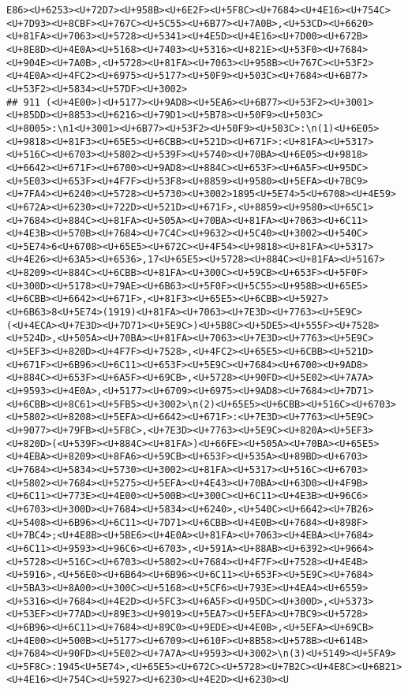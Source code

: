 \documentclass[
]{article}
\begin{document}
\begin{verbatim}
E86><U+6253><U+72D7><U+958B><U+6E2F><U+5F8C><U+7684><U+4E16><U+754C><U+7D93><U+8CBF><U+767C><U+5C55><U+6B77><U+7A0B>,<U+53CD><U+6620><U+81FA><U+7063><U+5728><U+5341><U+4E5D><U+4E16><U+7D00><U+672B><U+8E8D><U+4E0A><U+5168><U+7403><U+5316><U+821E><U+53F0><U+7684><U+904E><U+7A0B>,<U+5728><U+81FA><U+7063><U+958B><U+767C><U+53F2><U+4E0A><U+4FC2><U+6975><U+5177><U+50F9><U+503C><U+7684><U+6B77><U+53F2><U+5834><U+57DF><U+3002>
## 911 (<U+4E00>)<U+5177><U+9AD8><U+5EA6><U+6B77><U+53F2><U+3001><U+85DD><U+8853><U+6216><U+79D1><U+5B78><U+50F9><U+503C><U+8005>:\n1<U+3001><U+6B77><U+53F2><U+50F9><U+503C>:\n(1)<U+6E05><U+9818><U+81F3><U+65E5><U+6CBB><U+521D><U+671F>:<U+81FA><U+5317><U+516C><U+6703><U+5802><U+539F><U+5740><U+70BA><U+6E05><U+9818><U+6642><U+671F><U+6700><U+9AD8><U+884C><U+653F><U+6A5F><U+95DC><U+5E03><U+653F><U+4F7F><U+53F8><U+8859><U+9580><U+5EFA><U+7BC9><U+7FA4><U+6240><U+5728><U+5730><U+3002>1895<U+5E74>5<U+6708><U+4E59><U+672A><U+6230><U+722D><U+521D><U+671F>,<U+8859><U+9580><U+65C1><U+7684><U+884C><U+81FA><U+505A><U+70BA><U+81FA><U+7063><U+6C11><U+4E3B><U+570B><U+7684><U+7C4C><U+9632><U+5C40><U+3002><U+540C><U+5E74>6<U+6708><U+65E5><U+672C><U+4F54><U+9818><U+81FA><U+5317><U+4E26><U+63A5><U+6536>,17<U+65E5><U+5728><U+884C><U+81FA><U+5167><U+8209><U+884C><U+6CBB><U+81FA><U+300C><U+59CB><U+653F><U+5F0F><U+300D><U+5178><U+79AE><U+6B63><U+5F0F><U+5C55><U+958B><U+65E5><U+6CBB><U+6642><U+671F>,<U+81F3><U+65E5><U+6CBB><U+5927><U+6B63>8<U+5E74>(1919)<U+81FA><U+7063><U+7E3D><U+7763><U+5E9C>(<U+4ECA><U+7E3D><U+7D71><U+5E9C>)<U+5B8C><U+5DE5><U+555F><U+7528><U+524D>,<U+505A><U+70BA><U+81FA><U+7063><U+7E3D><U+7763><U+5E9C><U+5EF3><U+820D><U+4F7F><U+7528>,<U+4FC2><U+65E5><U+6CBB><U+521D><U+671F><U+6B96><U+6C11><U+653F><U+5E9C><U+7684><U+6700><U+9AD8><U+884C><U+653F><U+6A5F><U+69CB>,<U+5728><U+90FD><U+5E02><U+7A7A><U+9593><U+4E0A>,<U+5177><U+6709><U+6975><U+9AD8><U+7684><U+7D71><U+6CBB><U+8C61><U+5FB5><U+3002>\n(2)<U+65E5><U+6CBB><U+516C><U+6703><U+5802><U+8208><U+5EFA><U+6642><U+671F>:<U+7E3D><U+7763><U+5E9C><U+9077><U+79FB><U+5F8C>,<U+7E3D><U+7763><U+5E9C><U+820A><U+5EF3><U+820D>(<U+539F><U+884C><U+81FA>)<U+66FE><U+505A><U+70BA><U+65E5><U+4EBA><U+8209><U+8FA6><U+59CB><U+653F><U+535A><U+89BD><U+6703><U+7684><U+5834><U+5730><U+3002><U+81FA><U+5317><U+516C><U+6703><U+5802><U+7684><U+5275><U+5EFA><U+4E43><U+70BA><U+63D0><U+4F9B><U+6C11><U+773E><U+4E00><U+500B><U+300C><U+6C11><U+4E3B><U+96C6><U+6703><U+300D><U+7684><U+5834><U+6240>,<U+540C><U+6642><U+7B26><U+5408><U+6B96><U+6C11><U+7D71><U+6CBB><U+4E0B><U+7684><U+898F><U+7BC4>;<U+4E8B><U+5BE6><U+4E0A><U+81FA><U+7063><U+4EBA><U+7684><U+6C11><U+9593><U+96C6><U+6703>,<U+591A><U+88AB><U+6392><U+9664><U+5728><U+516C><U+6703><U+5802><U+7684><U+4F7F><U+7528><U+4E4B><U+5916>,<U+56E0><U+6B64><U+6B96><U+6C11><U+653F><U+5E9C><U+7684><U+5BA3><U+8A00><U+300C><U+5168><U+5CF6><U+793E><U+4EA4><U+6559><U+5316><U+7684><U+4E2D><U+5FC3><U+6A5F><U+95DC><U+300D>,<U+5373><U+53EF><U+77AD><U+89E3><U+9019><U+5EA7><U+5EFA><U+7BC9><U+5728><U+6B96><U+6C11><U+7684><U+89C0><U+9EDE><U+4E0B>,<U+5EFA><U+69CB><U+4E00><U+500B><U+5177><U+6709><U+610F><U+8B58><U+578B><U+614B><U+7684><U+90FD><U+5E02><U+7A7A><U+9593><U+3002>\n(3)<U+5149><U+5FA9><U+5F8C>:1945<U+5E74>,<U+65E5><U+672C><U+5728><U+7B2C><U+4E8C><U+6B21><U+4E16><U+754C><U+5927><U+6230><U+4E2D><U+6230><U
\end{verbatim}
\end{document}
